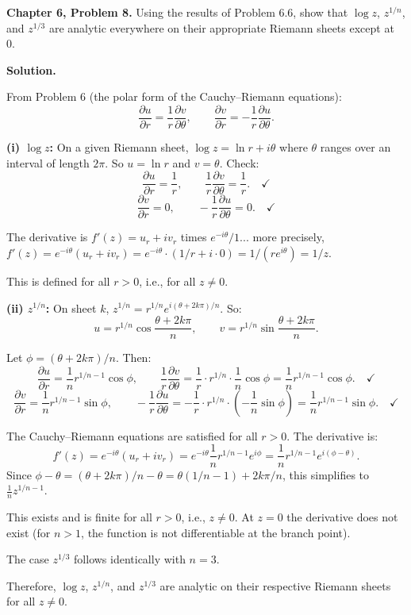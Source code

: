 \documentclass[12pt]{article}
\begin{document}
\textbf{Chapter 6, Problem 8.} Using the results of Problem 6.6, show that $\log z$, $z^{1/n}$, and $z^{1/3}$ are analytic everywhere on their appropriate Riemann sheets except at 0.

\bigskip
\textbf{Solution.}

From Problem 6 (the polar form of the Cauchy--Riemann equations):
\[
\frac{\partial u}{\partial r} = \frac{1}{r}\frac{\partial v}{\partial \theta}, \qquad \frac{\partial v}{\partial r} = -\frac{1}{r}\frac{\partial u}{\partial \theta}.
\]

\textbf{(i) $\log z$:} On a given Riemann sheet, $\log z = \ln r + i\theta$ where $\theta$ ranges over an interval of length $2\pi$. So $u = \ln r$ and $v = \theta$. Check:
\[
\frac{\partial u}{\partial r} = \frac{1}{r}, \qquad \frac{1}{r}\frac{\partial v}{\partial \theta} = \frac{1}{r}. \quad \checkmark
\]
\[
\frac{\partial v}{\partial r} = 0, \qquad -\frac{1}{r}\frac{\partial u}{\partial \theta} = 0. \quad \checkmark
\]

The derivative is $f'(z) = u_r + iv_r$ times $e^{-i\theta}/1$... more precisely, $f'(z) = e^{-i\theta}(u_r + iv_r) = e^{-i\theta}\cdot(1/r + i\cdot 0) = 1/(re^{i\theta}) = 1/z$.

This is defined for all $r > 0$, i.e., for all $z \neq 0$.

\textbf{(ii) $z^{1/n}$:} On sheet $k$, $z^{1/n} = r^{1/n}e^{i(\theta+2k\pi)/n}$. So:
\[
u = r^{1/n}\cos\!\frac{\theta+2k\pi}{n}, \qquad v = r^{1/n}\sin\!\frac{\theta+2k\pi}{n}.
\]

Let $\phi = (\theta + 2k\pi)/n$. Then:
\[
\frac{\partial u}{\partial r} = \frac{1}{n}r^{1/n-1}\cos\phi, \qquad \frac{1}{r}\frac{\partial v}{\partial \theta} = \frac{1}{r}\cdot r^{1/n}\cdot\frac{1}{n}\cos\phi = \frac{1}{n}r^{1/n-1}\cos\phi. \quad\checkmark
\]
\[
\frac{\partial v}{\partial r} = \frac{1}{n}r^{1/n-1}\sin\phi, \qquad -\frac{1}{r}\frac{\partial u}{\partial \theta} = -\frac{1}{r}\cdot r^{1/n}\cdot\left(-\frac{1}{n}\sin\phi\right) = \frac{1}{n}r^{1/n-1}\sin\phi. \quad\checkmark
\]

The Cauchy--Riemann equations are satisfied for all $r > 0$. The derivative is:
\[
f'(z) = e^{-i\theta}(u_r + iv_r) = e^{-i\theta}\frac{1}{n}r^{1/n-1}e^{i\phi} = \frac{1}{n}r^{1/n-1}e^{i(\phi-\theta)}.
\]
Since $\phi - \theta = (\theta+2k\pi)/n - \theta = \theta(1/n-1) + 2k\pi/n$, this simplifies to $\frac{1}{n}z^{1/n-1}$.

This exists and is finite for all $r > 0$, i.e., $z \neq 0$. At $z = 0$ the derivative does not exist (for $n > 1$, the function is not differentiable at the branch point).

The case $z^{1/3}$ follows identically with $n = 3$.

Therefore, $\log z$, $z^{1/n}$, and $z^{1/3}$ are analytic on their respective Riemann sheets for all $z \neq 0$.
\end{document}
